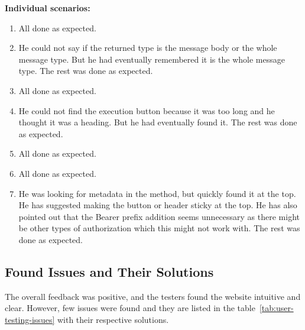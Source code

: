 \textbf{Individual scenarios:}
\begin{enumerate}
    \item All done as expected.
    \item He could not say if the returned type is the message body or the whole message type.
    But he had eventually remembered it is the whole message type.
    The rest was done as expected.
    \item All done as expected.
    \item He could not find the execution button because it was too long and he thought it was a heading.
    But he had eventually found it.
    The rest was done as expected.
    \item All done as expected.
    \item All done as expected.
    \item He was looking for metadata in the method, but quickly found it at the top.
    He has suggested making the button or header sticky at the top.
    He has also pointed out that the Bearer prefix addition seems unnecessary as there might be other types of authorization which this might not work with.
    The rest was done as expected.
\end{enumerate}

\subsection{Found Issues and Their Solutions}\label{subsec:found-issues-and-their-solutions}
The overall feedback was positive, and the testers found the website intuitive and clear.
However, few issues were found and they are listed in the table~\ref{tab:user-testing-issues} with their respective solutions.

